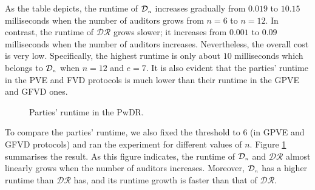


%


As the  table depicts, the runtime of $\mathcal{D}_{\scriptscriptstyle n}$    increases gradually from $0.019$ to $10.15$ milliseconds when the number of auditors grows from $n=6$ to $n=12$.  In contrast, the runtime of $\mathcal{DR}$ grows slower; it increases from  $0.001$ to $0.09$ milliseconds when the number of auditors increases. Nevertheless, the overall cost is very low. Specifically, the highest runtime is only about $10$ milliseconds which belongs to $\mathcal{D}_{\scriptscriptstyle n}$ when $n=12$ and $e=7$. It is also evident that the parties' runtime in the PVE and FVD protocols is much lower than their runtime in the GPVE and GFVD ones.


%
\begin{figure}[H]
\centering
{}
\vspace{-3mm}
\caption{\small Parties' runtime in the PwDR.}\label{plot::runtime}
\vspace{-3mm}
\end{figure}



 To compare the parties' runtime, we also fixed the threshold to $6$ (in GPVE and GFVD protocols) and ran the experiment for different values of $n$. Figure  \ref{plot::runtime} summarises the result. As this figure indicates, the runtime of  $\mathcal{D}_{\scriptscriptstyle n}$ and $\mathcal{DR}$ almost linearly grows when the number of auditors increases. Moreover,   $\mathcal{D}_{\scriptscriptstyle n}$  has a higher runtime than $\mathcal{DR}$ has,   and its runtime growth is faster than that of $\mathcal{DR}$. 





